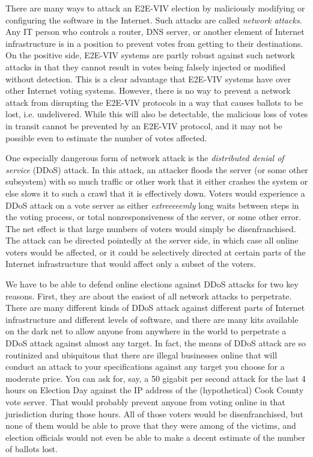 There are many ways to attack an E2E-VIV election by maliciously
modifying or configuring the software in the Internet. Such attacks
are called \emph{network attacks}. Any IT person who controls a
router, DNS server, or another element of Internet infrastructure is
in a position to prevent votes from getting to their destinations.  On
the positive side, E2E-VIV systems are partly robust against such
network attacks in that they cannot result in votes being falsely
injected or modified without detection. This is a clear advantage that
E2E-VIV systems have over other Internet voting systems. However,
there is no way to prevent a network attack from disrupting the
E2E-VIV protocols in a way that causes ballots to be lost,
i.e. undelivered.  While this will also be detectable, the malicious
loss of votes in transit cannot be prevented by an E2E-VIV protocol,
and it may not be possible even to estimate the number of votes
affected.

One especially dangerous form of network attack is the
\emph{distributed denial of service} (DDoS) attack.  In this attack,
an attacker floods the server (or some other subsystem) with so much
traffic or other work that it either crashes the system or else slows
it to such a crawl that it is effectively down. Voters would
experience a DDoS attack on a vote server as either
\emph{extreeeeemly} long waits between steps in the voting process, or
total nonresponsiveness of the server, or some other error. The net
effect is that large numbers of voters would simply be
disenfranchised. The attack can be directed pointedly at the server
side, in which case all online voters would be affected, or it could
be selectively directed at certain parts of the Internet
infrastructure that would affect only a subset of the voters.

We have to be able to defend online elections against DDoS attacks for
two key reasons.  First, they are about the easiest of all network
attacks to perpetrate.  There are many different kinds of DDoS attack
against different parts of Internet infrastructure and different
levels of software, and there are many kits available on the dark net
to allow anyone from anywhere in the world to perpetrate a DDoS attack
against almost any target. In fact, the means of DDoS attack are so
routinized and ubiquitous that there are illegal businesses online
that will conduct an attack to your specifications against any target
you choose for a moderate price. You can ask for, say, a 50 gigabit
per second attack for the last 4 hours on Election Day against the IP
address of the (hypothetical) Cook County vote server. That would
probably prevent anyone from voting online in that jurisdiction during
those hours. All of those voters would be disenfranchised, but none of
them would be able to prove that they were among of the victims, and
election officials would not even be able to make a decent estimate of
the number of ballots lost.

